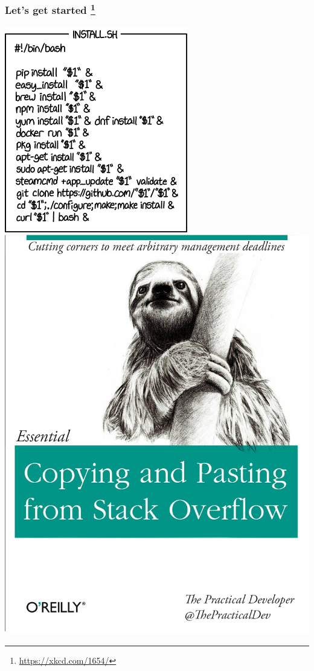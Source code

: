 
\begin{frame}
  \frametitle{Let's get started
    \footnote{\tiny{\href{https://xkcd.com/1654/}{https://xkcd.com/1654/}}}
  }
  \begin{center}
    \includegraphics[height=0.7\textheight,valign=t]{images/universal_install_script}    
    \includegraphics[height=0.7\textheight,valign=t]{images/oreilly_stack_overflow}        
  \end{center}
\end{frame}